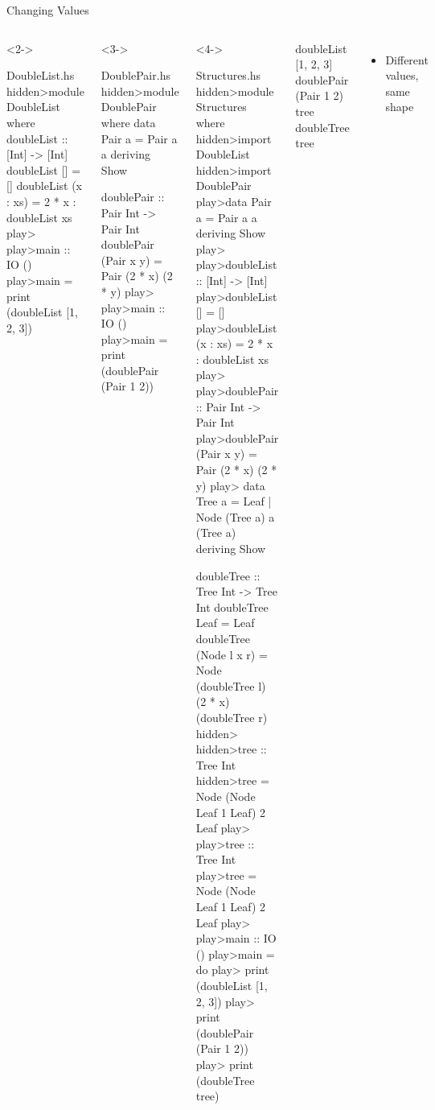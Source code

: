 \begin{frame}[fragile]{Changing Values}
\begin{fullwidth}
\begin{columns}[T,onlytextwidth]
%
\begin{uncoverenv}<2->
\begin{mhsfile}{DoubleList.hs}
hidden>module DoubleList where
doubleList :: [Int] -> [Int]
doubleList []       = []
doubleList (x : xs) = 2 * x : doubleList xs
play>
play>main :: IO ()
play>main = print (doubleList [1, 2, 3])
\end{mhsfile}
\end{uncoverenv}
\begin{uncoverenv}<3->
\begin{mhsfile}{DoublePair.hs}
hidden>module DoublePair where
data Pair a = Pair a a deriving Show

doublePair :: Pair Int -> Pair Int
doublePair (Pair x y) = Pair (2 * x) (2 * y)
play>
play>main :: IO ()
play>main = print (doublePair (Pair 1 2))
\end{mhsfile}
\end{uncoverenv}
\begin{uncoverenv}<4->
\begin{mhsfile}{Structures.hs}
hidden>module Structures where
hidden>import DoubleList
hidden>import DoublePair
play>data Pair a = Pair a a deriving Show
play>
play>doubleList :: [Int] -> [Int]
play>doubleList []       = []
play>doubleList (x : xs) = 2 * x : doubleList xs
play>
play>doublePair :: Pair Int -> Pair Int
play>doublePair (Pair x y) = Pair (2 * x) (2 * y)
play>
data Tree a = Leaf | Node (Tree a) a (Tree a)
  deriving Show

doubleTree :: Tree Int -> Tree Int
doubleTree Leaf         = Leaf
doubleTree (Node l x r) =
  Node (doubleTree l) (2 * x) (doubleTree r)
hidden>
hidden>tree :: Tree Int
hidden>tree = Node (Node Leaf 1 Leaf) 2 Leaf
play>
play>tree :: Tree Int
play>tree = Node (Node Leaf 1 Leaf) 2 Leaf
play>
play>main :: IO ()
play>main = do
play>  print (doubleList [1, 2, 3])
play>  print (doublePair (Pair 1 2))
play>  print (doubleTree tree)
\end{mhsfile}
\end{uncoverenv}
%
\begin{ghcisession}[start=2]
doubleList [1, 2, 3]
doublePair (Pair 1 2)
tree
doubleTree tree
\end{ghcisession}
\vspace{4mm}
\begin{itemize}
   \item<5-> Different values, same shape
\end{itemize}
\end{columns}
\end{fullwidth}
\end{frame}

